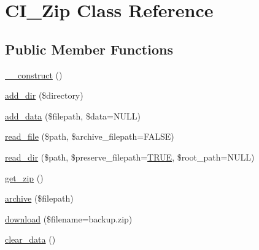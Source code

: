 \hypertarget{class_c_i___zip}{}\section{C\+I\+\_\+\+Zip Class Reference}
\label{class_c_i___zip}
\subsection*{Public Member Functions}
\begin{DoxyCompactItemize}
\item 
\mbox{\hyperlink{class_c_i___zip_a095c5d389db211932136b53f25f39685}{\+\_\+\+\_\+construct}} ()
\item 
\mbox{\hyperlink{class_c_i___zip_a86b6a309dad105e43b446dc9f8820703}{add\+\_\+dir}} (\$directory)
\item 
\mbox{\hyperlink{class_c_i___zip_a8d541e6609a5b2634a6a2bc7731465a5}{add\+\_\+data}} (\$filepath, \$data=N\+U\+LL)
\item 
\mbox{\hyperlink{class_c_i___zip_aa43eef46a052a3aff7a2ff0bf5c21c75}{read\+\_\+file}} (\$path, \$archive\+\_\+filepath=F\+A\+L\+SE)
\item 
\mbox{\hyperlink{class_c_i___zip_a296847a86d7cf0e4bba9b71a173cfffe}{read\+\_\+dir}} (\$path, \$preserve\+\_\+filepath=\mbox{\hyperlink{constants_8php_ae04a3efe6aa42044f803ee90c2277846}{T\+R\+UE}}, \$root\+\_\+path=N\+U\+LL)
\item 
\mbox{\hyperlink{class_c_i___zip_a263fd906f99ccca15a12fe34a79656e4}{get\+\_\+zip}} ()
\item 
\mbox{\hyperlink{class_c_i___zip_a935879d7074c751a4ac886aebd66cbd4}{archive}} (\$filepath)
\item 
\mbox{\hyperlink{class_c_i___zip_ad4263f6c296942842ae25a94053c5f16}{download}} (\$filename=\textquotesingle{}backup.\+zip\textquotesingle{})
\item 
\mbox{\hyperlink{class_c_i___zip_a89d046bac0ab06a81c5c03d55b4bcae5}{clear\+\_\+data}} ()
\end{DoxyCompactItemize}
